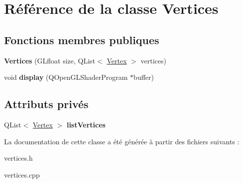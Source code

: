 \hypertarget{classVertices}{}\section{Référence de la classe Vertices}
\label{classVertices}
\subsection*{Fonctions membres publiques}
\begin{DoxyCompactItemize}
\item 
\mbox{\label{classVertices_a0e5ea2dc410ecddbf53cad4596f76f27}} 
{\bfseries Vertices} (G\+Lfloat size, Q\+List$<$ \hyperlink{classVertex}{Vertex} $>$ vertices)
\item 
\mbox{\label{classVertices_a895d24fd3fb8a8b5bbde01a9c2008eb4}} 
void {\bfseries display} (Q\+Open\+G\+L\+Shader\+Program $\ast$buffer)
\end{DoxyCompactItemize}
\subsection*{Attributs privés}
\begin{DoxyCompactItemize}
\item 
\mbox{\label{classVertices_aa327866846970b377bea0f549f9e48e3}} 
Q\+List$<$ \hyperlink{classVertex}{Vertex} $>$ {\bfseries list\+Vertices}
\end{DoxyCompactItemize}


La documentation de cette classe a été générée à partir des fichiers suivants \+:\begin{DoxyCompactItemize}
\item 
vertices.\+h\item 
vertices.\+cpp\end{DoxyCompactItemize}
